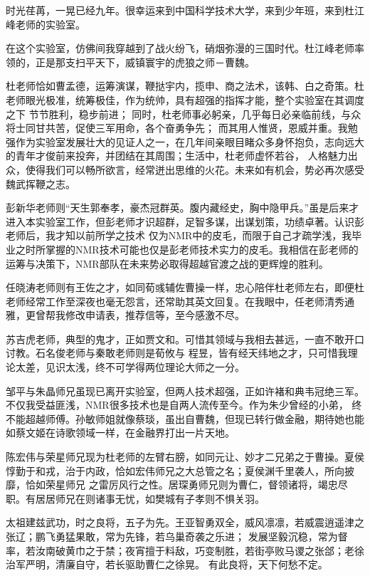 ﻿
\begin{thanks}

时光荏苒，一晃已经九年。很幸运来到中国科学技术大学，来到少年班，来到杜江峰老师的实验室。

在这个实验室，仿佛间我穿越到了战火纷飞，硝烟弥漫的三国时代。杜江峰老师率领的，正是那支扫平天下，威镇寰宇的虎狼之师－曹魏。

杜老师恰如曹孟德，运筹演谋，鞭挞宇内，揽申、商之法术，该韩、白之奇策。杜老师眼光极准，统筹极佳，作为统帅，具有超强的指挥才能，整个实验室在其调度之下
节节胜利，稳步前进；
同时，杜老师事必躬亲，几乎每日必亲临前线，与众将士同甘共苦，促使三军用命，各个奋勇争先；
而其用人惟贤，恩威并重。我勉强作为实验室发展壮大的见证人之一，在几年间亲眼目睹众多身怀抱负，志向远大的青年才俊前来投奔，并团结在其周围；生活中，杜老师虚怀若谷，
人格魅力出众，使得我们可以畅所欲言，经常迸出思维的火花。未来如有机会，势必再次感受魏武挥鞭之志。

彭新华老师则“天生郭奉孝，豪杰冠群英。腹内藏经史，胸中隐甲兵。”虽是后来才进入本实验室工作，但彭老师才识超群，足智多谋，出谋划策，功绩卓著。认识彭老师后，我才知以前所学之技术
仅为NMR中的皮毛，而限于自己才疏学浅，我毕业之时所掌握的NMR技术可能也仅是彭老师技术实力的皮毛。我相信在彭老师的运筹与决策下，NMR部队在未来势必取得超越官渡之战的更辉煌的胜利。

任晓涛老师则有王佐之才，如同荀彧辅佐曹操一样，忠心陪伴杜老师左右，即便杜老师经常工作至深夜也毫无怨言，还常助其英文回复。在我眼中，任老师清秀通雅，更曾帮我修改申请表，推荐信等，至今感激不尽。

苏吉虎老师，典型的鬼才，正如贾文和。可惜其领域与我相去甚远，一直不敢开口讨教。石名俊老师与秦敢老师则是荀攸与
程昱，皆有经天纬地之才，只可惜我理论太差，见识太浅，终不可学得两位理论大师之一分。

邹平与朱晶师兄虽现已离开实验室，但两人技术超强，正如许褚和典韦冠绝三军。不仅我受益匪浅，NMR很多技术也是自两人流传至今。作为朱少曾经的小弟，
终不能超越师傅。孙敏师姐就像蔡琰，虽出自曹魏，但现已转行做金融，期待她也能如蔡文姬在诗歌领域一样，在金融界打出一片天地。

陈宏伟与荣星师兄现为杜老师的左臂右膀，如同元让、妙才二兄弟之于曹操。夏侯惇勤于和戎，治于内政，恰如宏伟师兄之大总管之名；夏侯渊千里袭人，所向披靡，恰如荣星师兄
之雷厉风行之性。居琛勇师兄则为曹仁，督领诸将，竭忠尽职。有居居师兄在则诸事无忧，如樊城有子孝则不惧关羽。

太祖建兹武功，时之良将，五子为先。王亚智勇双全，威风凛凛，若威震逍遥津之张辽；鹏飞勇猛果敢，常为先锋，若乌巢奇袭之乐进；
发展坚毅沉稳，常为督率，若汝南破黄巾之于禁；夜宵擅于料敌，巧变制胜，若街亭败马谡之张郃；老徐治军严明，清廉自守，若长驱助曹仁之徐晃。
有此良将，天下何愁不定。


\end{thanks}
